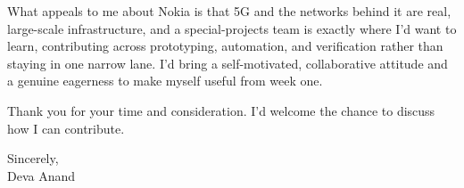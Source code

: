 \documentclass[letterpaper,11pt]{article}
\begin{document}
What appeals to me about Nokia is that 5G and the networks behind it are real, large-scale infrastructure, and a special-projects team is exactly where I'd want to learn, contributing across prototyping, automation, and verification rather than staying in one narrow lane. I'd bring a self-motivated, collaborative attitude and a genuine eagerness to make myself useful from week one.

\vspace{4pt}
Thank you for your time and consideration. I'd welcome the chance to discuss how I can contribute.

\vspace{8pt}
Sincerely, \\
Deva Anand
\end{document}
